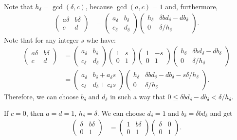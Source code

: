 \documentclass{article}
\begin{document}
Note that $h_\delta=\gcd(\delta, c)$, because $\gcd(a,c)=1$ and,
furthermore,
\begin{align}
\begin{pmatrix}a\delta&b\delta\\c&d\end{pmatrix}
&=\begin{pmatrix}a_\delta&b_\delta\\c_\delta&d_\delta\end{pmatrix}
  \begin{pmatrix}h_\delta&\delta b d_\delta-d b_\delta\\
                 0      &\delta / h_\delta\end{pmatrix}.
\label{eq:naive-matrix-split}
\end{align}
Note that for any integer $s$ whe have:
\begin{align*}
\begin{pmatrix}a\delta&b\delta\\c&d\end{pmatrix}
&=\begin{pmatrix}a_\delta&b_\delta\\c_\delta&d_\delta\end{pmatrix}
  \begin{pmatrix}1& s\\0&1\end{pmatrix}
  \begin{pmatrix}1&-s\\0&1\end{pmatrix}
  \begin{pmatrix}
    h_\delta&\delta b d_\delta-d b_\delta\\
    0      &\delta / h_\delta\end{pmatrix}
  \\
&=
  \begin{pmatrix}
    a_\delta&b_\delta + a_\delta s\\
    c_\delta&d_\delta + c_\delta s
  \end{pmatrix}
  \begin{pmatrix}h_\delta&\delta b d_\delta-d b_\delta-s \delta / h_\delta\\
                 0      &\delta / h_\delta\end{pmatrix}.
\end{align*}
Therefore, we can choose $b_\delta$ and $d_\delta$ in such a way that
$0 \le \delta b d_\delta-d b_\delta < \delta/h_\delta$.

If $c=0$, then $a=d=1$, $h_\delta=\delta$. We can choose $d_\delta=1$
and $b_\delta= \delta b  d_\delta$ and get
\begin{align}
\begin{pmatrix}\delta&b\delta\\0&1\end{pmatrix}
&=\begin{pmatrix}1&b \delta\\0&1\end{pmatrix}
  \begin{pmatrix}\delta&0\\
                 0      &1\end{pmatrix}.
\end{align}
\end{document}
